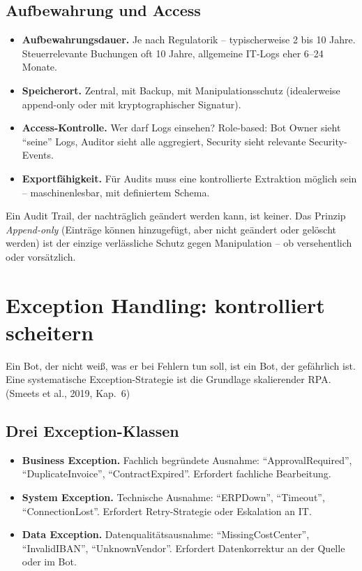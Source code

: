 \documentclass[11pt,a4paper,oneside]{article}
\newcommand{\fachbegriff}[1]{\textbf{#1}}
\newcommand{\quelle}[1]{{\footnotesize\color{lpGray}(#1)}}
\begin{document}
\subsection{Aufbewahrung und Access}

\begin{itemize}
  \item \textbf{Aufbewahrungsdauer.} Je nach Regulatorik -- typischerweise 2 bis 10 Jahre. Steuerrelevante Buchungen oft 10 Jahre, allgemeine IT-Logs eher 6--24 Monate.
  \item \textbf{Speicherort.} Zentral, mit Backup, mit Manipulationsschutz (idealerweise append-only oder mit kryptographischer Signatur).
  \item \textbf{Access-Kontrolle.} Wer darf Logs einsehen? Role-based: Bot Owner sieht ``seine'' Logs, Auditor sieht alle aggregiert, Security sieht relevante Security-Events.
  \item \textbf{Exportfähigkeit.} Für Audits muss eine kontrollierte Extraktion möglich sein -- maschinenlesbar, mit definiertem Schema.
\end{itemize}

\begin{merkbox}
Ein Audit Trail, der nachträglich geändert werden kann, ist keiner. Das Prinzip \emph{Append-only} (Einträge können hinzugefügt, aber nicht geändert oder gelöscht werden) ist der einzige verlässliche Schutz gegen Manipulation -- ob versehentlich oder vorsätzlich.
\end{merkbox}

\section{Exception Handling: kontrolliert scheitern}

Ein Bot, der nicht weiß, was er bei Fehlern tun soll, ist ein Bot, der gefährlich ist. Eine systematische Exception-Strategie ist die Grundlage skalierender RPA. \quelle{Smeets et al., 2019, Kap.~6}

\subsection{Drei Exception-Klassen}

\begin{itemize}
  \item \fachbegriff{Business Exception.} Fachlich begründete Ausnahme: ``ApprovalRequired'', ``DuplicateInvoice'', ``ContractExpired''. Erfordert fachliche Bearbeitung.
  \item \fachbegriff{System Exception.} Technische Ausnahme: ``ERPDown'', ``Timeout'', ``ConnectionLost''. Erfordert Retry-Strategie oder Eskalation an IT.
  \item \fachbegriff{Data Exception.} Datenqualitätsausnahme: ``MissingCostCenter'', ``InvalidIBAN'', ``UnknownVendor''. Erfordert Datenkorrektur an der Quelle oder im Bot.
\end{itemize}
\end{document}
